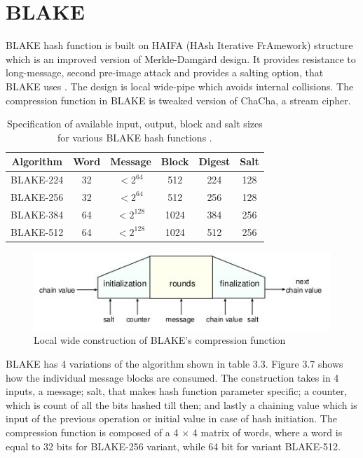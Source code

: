 \section{BLAKE} 

BLAKE \cite{00002} hash function is built on HAIFA (HAsh Iterative FrAmework) structure \cite{00020} which is an improved
version of Merkle-Damg\.{a}rd design. It provides resistance to long-message, second pre-image attack and provides a 
salting option, that BLAKE uses \cite{00021}.
The design is local wide-pipe which avoids internal collisions. The compression function in BLAKE is tweaked version of 
ChaCha, a stream cipher. 

\begin{table}[h]
  \begin{center}
    \begin{tabular}{ *{6}{c} } \hline
      Algorithm & Word & Message     & Block & Digest & Salt \\ \hline
      BLAKE-224 & 32   & $< 2^{64}$  & 512   & 224    & 128  \\
      BLAKE-256 & 32   & $< 2^{64}$  & 512   & 256    & 128  \\
      BLAKE-384 & 64   & $< 2^{128}$ & 1024  & 384    & 256  \\
      BLAKE-512 & 64   & $< 2^{128}$ & 1024  & 512    & 256  \\ \hline
    \end{tabular}
    \caption{Specification of available input, output, block and salt sizes for various BLAKE hash functions \cite{00002}.}
  \end{center}
\end{table}

\begin{figure}[h]
  \begin{center}
    \includegraphics[width=4.75in]{blakelocalwidepipeconstruction.jpg}
  \end{center}
  \caption{Local wide construction of BLAKE's compression function \cite{00002}}
  \label{fig:lab}
\end{figure}

BLAKE has 4 variations of the algorithm shown in table 3.3. Figure 3.7 shows how the individual message blocks are
consumed. The construction takes in 4 inputs, a message; salt, that makes hash function parameter specific; a
counter, which is count of all the bits hashed till then; and lastly a chaining value which is input of the previous 
operation or initial value in case of hash initiation. The compression function is composed of a 4 $\times$ 4 matrix 
of words, where a word is equal to 32 bits for BLAKE-256 variant, while 64 bit for variant BLAKE-512.

